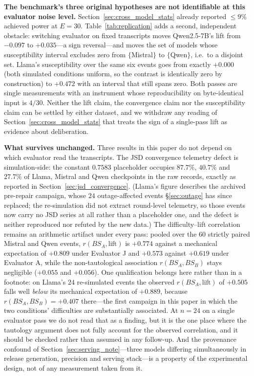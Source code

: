 \documentclass[11pt,journal,onecolumn]{IEEEtran}
\begin{document}
\textbf{The benchmark's three original hypotheses are not identifiable at this evaluator noise level.} Section~\ref{sec:cross_model_stats} already reported $\leq 9\%$ achieved power at $E = 30$. Table~\ref{tab:replication} adds a second, independent obstacle: switching evaluator on fixed transcripts moves Qwen2.5-7B's lift from $-0.097$ to $+0.035$---a sign reversal---and moves the set of models whose susceptibility interval excludes zero from $\{$Mistral$\}$ to $\{$Qwen$\}$, i.e.\ to a disjoint set. Llama's susceptibility over the same six events goes from exactly $+0.000$ (both simulated conditions uniform, so the contrast is identically zero by construction) to $+0.472$ with an interval that still spans zero. Both passes are single measurements with an instrument whose reproducibility on byte-identical input is $4/30$. Neither the lift claim, the convergence claim nor the susceptibility claim can be settled by either dataset, and we withdraw any reading of Section~\ref{sec:cross_model_stats} that treats the sign of a single-pass lift as evidence about deliberation.

\textbf{What survives unchanged.} Three results in this paper do not depend on which evaluator read the transcripts. The JSD convergence telemetry defect is simulation-side: the constant $0.7583$ placeholder occupies $87.7\%$, $40.7\%$ and $27.7\%$ of Llama, Mistral and Qwen checkpoints in the raw records, exactly as reported in Section~\ref{sec:jsd_convergence}. (Llama's figure describes the archived pre-repair campaign, whose $24$ outage-affected events \S\ref{sec:outage} has since replaced; the re-simulation did not extract round-level telemetry, so those events now carry no JSD series at all rather than a placeholder one, and the defect is neither reproduced nor refuted by the new data.) The difficulty--lift correlation remains an arithmetic artifact under every pass: pooled over the $60$ strictly paired Mistral and Qwen events, $r(BS_A, \text{lift})$ is $+0.774$ against a mechanical expectation of $+0.809$ under Evaluator J and $+0.573$ against $+0.619$ under Evaluator A, while the non-tautological association $r(BS_A, BS_B)$ stays negligible ($+0.055$ and $+0.056$). One qualification belongs here rather than in a footnote: on Llama's $24$ re-simulated events the observed $r(BS_A, \text{lift})$ of $+0.505$ falls well \emph{below} its mechanical expectation of $+0.889$, because $r(BS_A, BS_B) = +0.407$ there---the first campaign in this paper in which the two conditions' difficulties are substantially associated. At $n=24$ on a single evaluator pass we do not read that as a finding, but it is the one place where the tautology argument does not fully account for the observed correlation, and it should be checked rather than assumed in any follow-up. And the provenance confound of Section~\ref{sec:serving_note}---three models differing simultaneously in release generation, precision and serving stack---is a property of the experimental design, not of any measurement taken from it.
\end{document}
